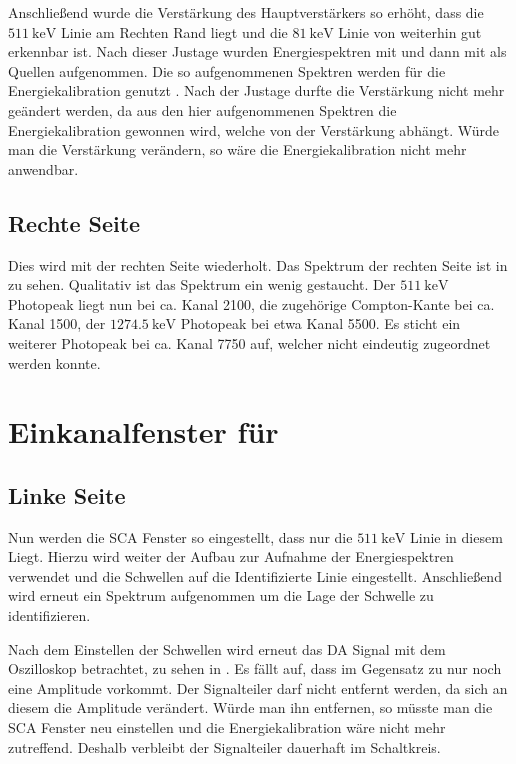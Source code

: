Anschließend wurde die Verstärkung des Hauptverstärkers so erhöht, dass die $\SI{511}{\kilo\eV}$ Linie am Rechten Rand liegt und die $\SI{81}{\kilo\eV}$ Linie von \ba weiterhin gut erkennbar ist. Nach dieser Justage wurden Energiespektren mit \na und dann mit \ba als Quellen aufgenommen. Die so aufgenommenen Spektren werden für die Energiekalibration genutzt \cite[5]{525va}. Nach der Justage durfte die Verstärkung nicht mehr geändert werden, da aus den hier aufgenommenen Spektren die Energiekalibration gewonnen wird, welche von der Verstärkung abhängt. Würde man die Verstärkung verändern, so wäre die Energiekalibration nicht mehr anwendbar.


\def\511kev{$\SI{511}{\kilo\eV}$}
\def\1200kev{$\SI{1274.5}{\kilo\eV}$}

\subsection*{Rechte Seite}
Dies wird mit der rechten Seite wiederholt. Das Spektrum der rechten Seite ist in  zu sehen. Qualitativ ist das \na Spektrum ein wenig gestaucht. Der \511kev Photopeak liegt nun bei ca. Kanal 2100, die zugehörige Compton-Kante bei ca. Kanal 1500, der \1200kev Photopeak bei etwa Kanal 5500. Es sticht ein weiterer Photopeak bei ca. Kanal 7750 auf, welcher nicht eindeutig zugeordnet werden konnte.





\section{Einkanalfenster für \na}
\label{sec:sca-fenster}

\subsection*{Linke Seite}
Nun werden die SCA Fenster so eingestellt, dass nur die \511kev Linie in diesem Liegt. Hierzu wird weiter der Aufbau zur Aufnahme der Energiespektren verwendet und die Schwellen auf die Identifizierte Linie eingestellt. Anschließend wird erneut ein Spektrum aufgenommen um die Lage der Schwelle zu identifizieren.

Nach dem Einstellen der Schwellen wird erneut das DA Signal mit dem Oszilloskop betrachtet, zu sehen in . Es fällt auf, dass im Gegensatz zu  nur noch eine Amplitude vorkommt. Der Signalteiler darf nicht entfernt werden, da sich an diesem die Amplitude verändert. Würde man ihn entfernen, so müsste man die SCA Fenster neu einstellen und die Energiekalibration wäre nicht mehr zutreffend. Deshalb verbleibt der Signalteiler dauerhaft im Schaltkreis.

